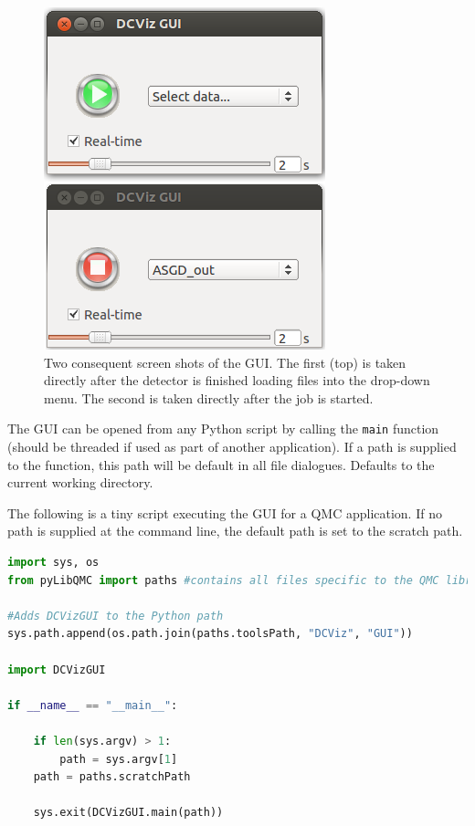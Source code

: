 \begin{figure}
 \begin{center}
  \includegraphics{../Graphics/gui.png}
  \caption{Two consequent screen shots of the GUI. The first (top) is taken directly after the detector is finished loading files into the drop-down menu. The second is taken directly after the job is started.}
  \label{fig:gui}
 \end{center}
\end{figure}

The GUI can be opened from any Python script by calling the \verb+main+ function (should be threaded if used as part of another application). If a path is supplied to the function,
this path will be default in all file dialogues. Defaults to the current working directory.

The following is a tiny script executing the GUI for a QMC application. If no path is supplied at the command line,
the default path is set to the scratch path.

\vspace{0.5cm}
\begin{lstlisting}[language=Python]
import sys, os
from pyLibQMC import paths #contains all files specific to the QMC library

#Adds DCVizGUI to the Python path
sys.path.append(os.path.join(paths.toolsPath, "DCViz", "GUI"))

import DCVizGUI

if __name__ == "__main__":

    if len(sys.argv) > 1:
        path = sys.argv[1]
    path = paths.scratchPath
   
    sys.exit(DCVizGUI.main(path))
\end{lstlisting}

